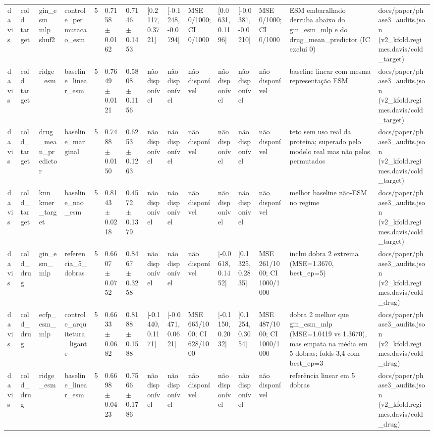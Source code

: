 \begin{table}[htbp]
\begin{tabular}{lllllllllllllll}
davis & cold\_target & gin\_esm\_mlp\_shuf2 & controle\_permutacao\_esm & 5 & 0.7158 $\pm$ 0.0162 & 0.7146 $\pm$ 0.1453 & [0.2117, 0.3721] & [-0.1248, -0.0794] & MSE 0/1000; CI 0/1000 & [0.0631, 0.1196] & [-0.0381, -0.0210] & MSE 0/1000; CI 0/1000 & ESM embaralhado derruba abaixo do gin\_esm\_mlp e do drug\_mean\_predictor (IC exclui 0) & docs/paper/phase3\_audits.json (v2\_kfold.regimes.davis/cold\_target) \\
davis & cold\_target & ridge\_esm & baseline\_linear\_esm & 5 & 0.7649 $\pm$ 0.0121 & 0.5808 $\pm$ 0.1156 & não disponível & não disponível & não disponível & não disponível & não disponível & não disponível & baseline linear com mesma representação ESM & docs/paper/phase3\_audits.json (v2\_kfold.regimes.davis/cold\_target) \\
davis & cold\_target & drug\_mean\_predictor & baseline\_marginal & 5 & 0.7488 $\pm$ 0.0150 & 0.6253 $\pm$ 0.1263 & não disponível & não disponível & não disponível & não disponível & não disponível & não disponível & teto sem uso real da proteína; superado pelo modelo real mas não pelos permutados & docs/paper/phase3\_audits.json (v2\_kfold.regimes.davis/cold\_target) \\
davis & cold\_target & knn\_kmer\_target & baseline\_nao\_esm & 5 & 0.8143 $\pm$ 0.0218 & 0.4572 $\pm$ 0.1379 & não disponível & não disponível & não disponível & não disponível & não disponível & não disponível & melhor baseline não-ESM no regime & docs/paper/phase3\_audits.json (v2\_kfold.regimes.davis/cold\_target) \\
davis & cold\_drug & gin\_esm\_mlp & referencia\_5\_dobras & 5 & 0.6607 $\pm$ 0.0752 & 0.8467 $\pm$ 0.3258 & não disponível & não disponível & não disponível & [-0.0618, 0.1452] & [0.1325, 0.2835] & MSE 261/1000; CI 1000/1000 & inclui dobra 2 extrema (MSE=1.3670, best\_ep=5) & docs/paper/phase3\_audits.json (v2\_kfold.regimes.davis/cold\_drug) \\
davis & cold\_drug & ecfp\_esm\_mlp & controle\_arquitetura\_ligante & 5 & 0.6633 $\pm$ 0.0682 & 0.8188 $\pm$ 0.1588 & [-0.1440, 0.1171] & [-0.0471, 0.0621] & MSE 665/1000; CI 628/1000 & [-0.1150, 0.2032] & [0.1254, 0.3054] & MSE 487/1000; CI 1000/1000 & dobra 2 melhor que gin\_esm\_mlp (MSE=1.0419 vs 1.3670), mas empata na média em 5 dobras; folds 3,4 com best\_ep=3 & docs/paper/phase3\_audits.json (v2\_kfold.regimes.davis/cold\_drug) \\
davis & cold\_drug & ridge\_esm & baseline\_linear\_esm & 5 & 0.6698 $\pm$ 0.0423 & 0.7566 $\pm$ 0.1786 & não disponível & não disponível & não disponível & não disponível & não disponível & não disponível & referência linear em 5 dobras & docs/paper/phase3\_audits.json (v2\_kfold.regimes.davis/cold\_drug) \\

\end{tabular}
\end{table}
